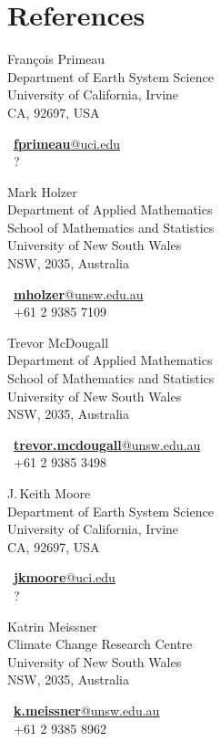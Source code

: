 \documentclass[12pt]{friggeri-cv}
\makeatletter
\newcommand{\cvRefsTwoCols}[2]{
  \begin{minipage}[t]{.45\textwidth}#1\end{minipage}
  \hfill
  \begin{minipage}[t]{.45\textwidth}#2\end{minipage}
}
\newcommand{\cvreference}[5]{
    {\headingfont\color{headercolor}#1}\\
    {#2}
    \begin{flushright}
    {\faEnvelope~\href{mailto:#3@#4}{\textbf{#3}@#4}\\}
    {\faMobile~#5\\}
    \end{flushright}
}
\makeatother
\begin{document}
\section{References}
\cvRefsTwoCols{
   \label{FP}
  \cvreference
    {Fran\c{c}ois Primeau}
    {Department of Earth System Science\\
     University of California, Irvine\\
     CA, 92697, USA}
    {fprimeau}
    {uci.edu}
    {?}%
  \phantomsection \label{MH}
  \cvreference
    {Mark Holzer}
    {Department of Applied Mathematics\\
     School of Mathematics and Statistics\\
     University of New South Wales\\
     NSW, 2035, Australia}
    {mholzer}
    {unsw.edu.au}
    {+61 2 9385 7109}
  \cvreference
    {Trevor McDougall}
    {Department of Applied Mathematics\\
     School of Mathematics and Statistics\\
     University of New South Wales\\
     NSW, 2035, Australia}
    {trevor.mcdougall}
    {unsw.edu.au}
    {+61 2 9385 3498}
}
{%
  \phantomsection \label{JKM}
  \cvreference
    {J.\,Keith Moore}
    {Department of Earth System Science\\
     University of California, Irvine\\
     CA, 92697, USA}
    {jkmoore}
    {uci.edu}
    {?}%
  \phantomsection \label{KM}
  \cvreference
    {Katrin Meissner}
    {Climate Change Research Centre\\
     University of New South Wales\\
     NSW, 2035, Australia}
    {k.meissner}
    {unsw.edu.au}
    {+61 2 9385 8962}
}
\vspace{10pt}



\newpage
{}
\end{document}

